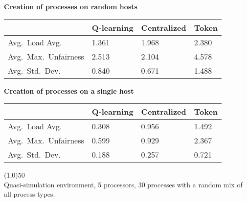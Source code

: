 \documentclass{slides}
\newcommand{\algtbl}[6]{

\begin{center}
\textbf{#1}
\end{center}

\begin{tabularx}{\linewidth}{|X|X|X|X|} \hline
	& \textbf{Q-learning} & \textbf{Centralized} & \textbf{Token} \\ \hline
	#2
\end{tabularx}

\begin{center}
\textbf{#3}
\end{center}

\begin{tabularx}{\linewidth}{|X|X|X|X|} \hline
	& \textbf{Q-learning} & \textbf{Centralized} & \textbf{Token} \\ \hline
	#4
\end{tabularx}

\vspace{1em}
\line(1,0){50} \\
#5
}
\begin{document}
\landscape


\algtbl{Creation of processes on random hosts}
{	Avg.\ Load Avg.\ & 1.361 & 1.968 & 2.380 \\ \hline
	Avg.\ Max.\ Unfairness & 2.513 & 2.104 & 4.578 \\ \hline
	Avg.\ Std.\ Dev.\ & 0.840 & 0.671 & 1.488 \\ \hline}
{Creation of processes on a single host}
{	Avg.\ Load Avg.\ & 0.308 & 0.956 & 1.492 \\ \hline
	Avg.\ Max.\ Unfairness & 0.599 & 0.929 & 2.367 \\ \hline
	Avg.\ Std.\ Dev.\ & 0.188 & 0.257 & 0.721 \\ \hline}
{Quasi-simulation environment, 5 processors, 30 processes with a random mix
of all process types.}
{Comparison of Process Creation Location}
\end{document}
